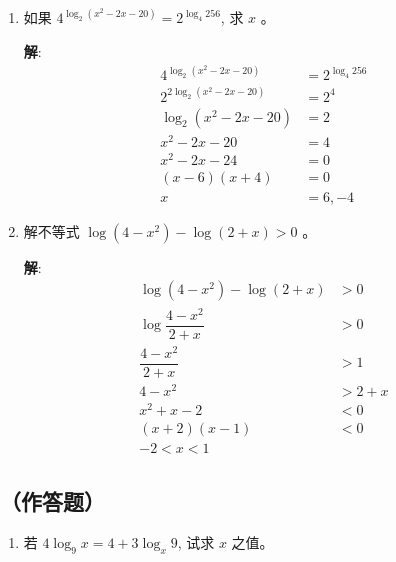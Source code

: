 \documentclass{report}
\newcommand{\sol}{\vspace{0.2cm}\textbf{解}:}
\begin{document}
\begin{multicols*}{2}
\begin{enumerate}[leftmargin=*]
        \item 如果 $4^{\log _2\left(x^2-2 x-20\right)}=2^{\log _4 256}$, 求 $x$ 。

              \sol{}
              \begin{align*}
                  4^{\log_2(x^2 - 2x - 20)}  & = 2^{\log_4 256} \\
                  2^{2\log_2(x^2 - 2x - 20)} & = 2^{4}          \\
                  \log_2(x^2 - 2x - 20)      & = 2              \\
                  x^2 - 2x - 20              & = 4              \\
                  x^2 - 2x - 24              & = 0              \\
                  (x - 6)(x + 4)             & = 0              \\
                  x                          & = 6, -4
              \end{align*}

        \item 解不等式 $\log \left(4-x^2\right)-\log (2+x)>0$ 。

              \sol{}
              \begin{align*}
                  \log (4 - x^2) - \log (2 + x) & > 0     \\
                  \log \dfrac{4 - x^2}{2 + x}   & > 0     \\
                  \dfrac{4 - x^2}{2 + x}        & > 1     \\
                  4 - x^2                       & > 2 + x \\
                  x^2 + x - 2                   & < 0     \\
                  (x + 2)(x - 1)                & < 0     \\
                  -2 < x < 1
              \end{align*}
    \end{enumerate}

    \subsection*{（作答题）}

    \begin{enumerate}[leftmargin=*]
        \item 若 $4 \log _9 x=4+3 \log _x 9$, 试求 $x$ 之值。


\end{enumerate}
\end{multicols*}
\end{document}
